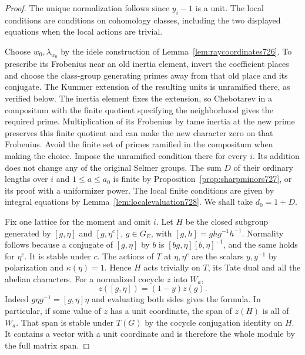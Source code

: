 \documentclass[a4paper,11pt]{article}
\theoremstyle{definition}
\theoremstyle{remark}
\numberwithin{equation}{section}
\begin{document}
\begin{proof}
The unique normalization follows since \(y_i-1\) is a unit. The local
conditions are conditions on cohomology classes, including the two
displayed equations when the local actions are trivial.

Choose \(w_0,\lambda_{w_0}\) by the idele construction of
Lemma~\ref{lem:raycoordinates726}. To prescribe its Frobenius near
an old inertia element, invert the coefficient places and choose the
class-group generating primes away from that old place and its conjugate.
The Kummer extension of the resulting units is unramified there,
as verified below. The inertia element fixes the extension, so
Chebotarev in a compositum with the finite quotient specifying the
neighborhood gives the required prime. Multiplication of its Frobenius
by tame inertia at the new prime preserves this finite quotient and can
make the new character zero on that Frobenius. Avoid the finite set
of primes ramified in the compositum when making the choice.
Impose the unramified condition there for every \(i\). Its addition
does not change any of the original Selmer groups. The sum \(D\) of
their ordinary lengths over \(i\) and \(1\le a\le a_0\) is finite
by Proposition~\ref{prop:sharpminors727}, or its proof with a
uniformizer power. The local finite conditions are given by integral
equations by Lemma~\ref{lem:localevaluation728}. We shall take
\(d_0=1+D\).

Fix one lattice for the moment and omit \(i\). Let \(H\) be the closed
subgroup generated by \([g,\eta]\) and \([g,\eta^c]\), \(g\in G_E\),
with \([g,h]=ghg^{-1}h^{-1}\). Normality follows because a conjugate of
\([g,\eta]\) by \(b\) is \([bg,\eta][b,\eta]^{-1}\), and the same
holds for \(\eta^c\). It is stable under \(c\). The actions of \(T\)
at \(\eta,\eta^c\) are the scalars \(y,y^{-1}\) by polarization and
\(\kappa(\eta)=1\). Hence \(H\) acts trivially on \(T\), its Tate dual
and all the abelian characters. For a normalized cocycle \(z\) into
\(W_a\),
\[
                z([g,\eta])=(1-y)z(g).
\]
Indeed \(g\eta g^{-1}=[g,\eta]\eta\) and evaluating both sides gives
the formula. In particular, if some value of \(z\) has a unit
coordinate, the span of \(z(H)\) is all of \(W_a\). That span is
stable under \(T(G)\) by the cocycle conjugation identity on \(H\).
It contains a vector with a unit coordinate and is therefore the
whole module by the full matrix span.


\end{proof}
\end{document}
